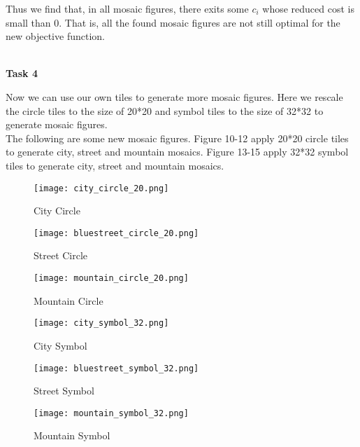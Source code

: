 \documentclass[12pt,a4paper]{article}
\begin{document}
\indent Thus we find that, in all mosaic figures, there exits some $c_{i}$ whose reduced cost is small than 0. That is, all the found mosaic figures are not still optimal for the new objective function. 

\thispagestyle{empty}
~\\
\normalsize \textbf{Task 4}\\
\par Now we can use our own tiles to generate more mosaic figures. Here we rescale the circle tiles to the size of 20*20 and symbol tiles to the size of 32*32 to generate mosaic figures.\\
\indent The following are some new mosaic figures. Figure 10-12 apply 20*20 circle tiles to generate city, street and mountain mosaics. Figure 13-15 apply 32*32 symbol tiles to generate city, street and mountain mosaics.
\newpage 
\begin{figure}[htbp]
	\centering
	\begin{minipage}[t]{0.32\linewidth}
		\centering
		\texttt{[image: city\_circle\_20.png]}
		\caption{City Circle}
	\end{minipage}
	\begin{minipage}[t]{0.32\linewidth}
		\centering
		\texttt{[image: bluestreet\_circle\_20.png]}
		\caption{Street Circle}
	\end{minipage}
	\begin{minipage}[t]{0.32\linewidth}
		\centering
		\texttt{[image: mountain\_circle\_20.png]}
		\caption{Mountain Circle}
	\end{minipage}                        
\end{figure}

\thispagestyle{empty}
\begin{figure}[htbp]
	\centering
	\begin{minipage}[t]{0.32\linewidth}
		\centering
		\texttt{[image: city\_symbol\_32.png]}
		\caption{City Symbol}
	\end{minipage}
	\begin{minipage}[t]{0.32\linewidth}
		\centering
		\texttt{[image: bluestreet\_symbol\_32.png]}
		\caption{Street Symbol}
	\end{minipage}
	\begin{minipage}[t]{0.32\linewidth}
		\centering
		\texttt{[image: mountain\_symbol\_32.png]}
		\caption{Mountain Symbol}
	\end{minipage}                        
\end{figure}	
	
\end{document}
